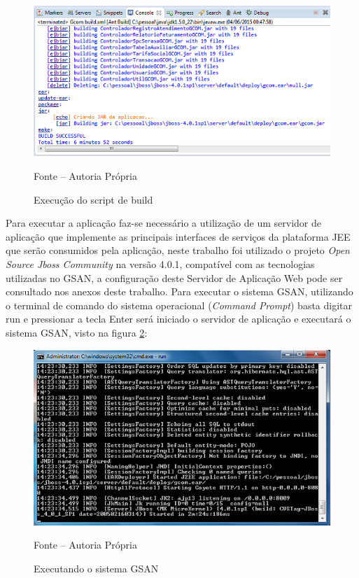 \begin{figure}[!htb]
	\centering
	\includegraphics{figuras/build_ant.png}
	\caption{Execução do script de build}	
	\label{figura:execucaoScriptBuild}
	Fonte – Autoria Própria
\end{figure}

Para executar a aplicação faz-se necessário a utilização de um servidor de aplicação que implemente as principais interfaces de serviços da plataforma JEE que serão consumidos pela aplicação, neste trabalho foi utilizado o projeto \textit{Open Source Jboss Community} na versão 4.0.1, compatível com as tecnologias utilizadas no GSAN, a configuração deste Servidor de Aplicação Web pode ser consultado nos anexos deste trabalho.
Para executar o sistema GSAN, utilizando o terminal de comando do sistema operacional (\textit{Command Prompt}) basta digitar run e pressionar a tecla Enter será iniciado o servidor de aplicação e executará o sistema GSAN, visto na figura \ref{figura:execucaoSistemaGSAN}:


\begin{figure}[!htb]
	\centering
	\includegraphics{figuras/executando_jboss.png}
	\caption{Executando o sistema GSAN}	
	\label{figura:execucaoSistemaGSAN}
	Fonte – Autoria Própria
\end{figure}


